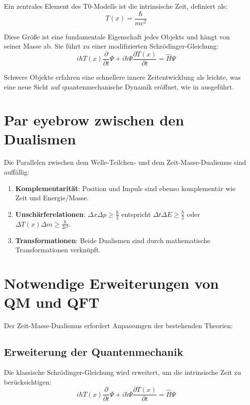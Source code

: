 \documentclass[a4paper,12pt]{article}
\newcommand{\Tfield}{T(x)}
\begin{document}
	Ein zentrales Element des T0-Modells ist die intrinsische Zeit, definiert als:
	\begin{equation}
		\Tfield = \frac{\hbar}{m c^2}
	\end{equation}
	
	Diese Größe ist eine fundamentale Eigenschaft jedes Objekts und hängt von seiner Masse ab. Sie führt zu einer modifizierten Schrödinger-Gleichung:
	\begin{equation}
		i\hbar \Tfield \frac{\partial}{\partial t} \Psi + i\hbar \Psi \frac{\partial \Tfield}{\partial t} = \hat{H} \Psi
	\end{equation}
	
	Schwere Objekte erfahren eine schnellere innere Zeitentwicklung als leichte, was eine neue Sicht auf quantenmechanische Dynamik eröffnet, wie in \cite{pascher_quantum_2025} ausgeführt.
	
	\section{Par eyebrow zwischen den Dualismen}
	
	Die Parallelen zwischen dem Welle-Teilchen- und dem Zeit-Masse-Dualismus sind auffällig:
	\begin{enumerate}
		\item \textbf{Komplementarität}: Position und Impuls sind ebenso komplementär wie Zeit und Energie/Masse.
		\item \textbf{Unschärferelationen}: \(\Delta x \Delta p \geq \frac{\hbar}{2}\) entspricht \(\Delta t \Delta E \geq \frac{\hbar}{2}\) oder \(\Delta \Tfield \Delta m \geq \frac{\hbar}{2c^2}\).
		\item \textbf{Transformationen}: Beide Dualismen sind durch mathematische Transformationen verknüpft.
	\end{enumerate}
	
	\section{Notwendige Erweiterungen von QM und QFT}
	
	Der Zeit-Masse-Dualismus erfordert Anpassungen der bestehenden Theorien:
	
	\subsection{Erweiterung der Quantenmechanik}
	
	Die klassische Schrödinger-Gleichung wird erweitert, um die intrinsische Zeit zu berücksichtigen:
	\begin{equation}
		i\hbar \Tfield \frac{\partial}{\partial t} \Psi + i\hbar \Psi \frac{\partial \Tfield}{\partial t} = \hat{H} \Psi
	\end{equation}
	
\end{document}
